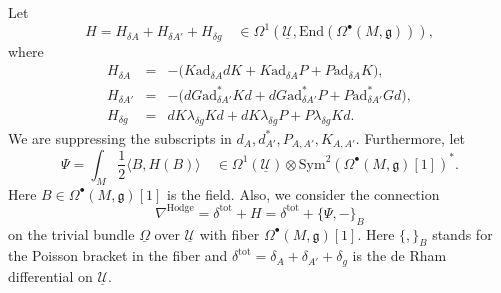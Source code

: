 \documentclass[11pt,a4paper]{amsart}
\theoremstyle{plain} %
\theoremstyle{definition}
\theoremstyle{remark}
\newcommand{\g}{\mathfrak{g}}
\newcommand{\mr}{\mathrm}
\newcommand{\bt}{\bullet}
\newcommand{\mc}{\mathcal}
\newcommand{\ad}{\mathrm{ad}}
\newcommand{\UU}{\underline{\mc{U}}}
\newcommand{\ul}{\underline}
\begin{document}
{Let
\begin{equation}\label{H}
H=H_{\delta A}+H_{\delta A'}+H_{\delta g}\quad \in \Omega^1(\UU,\mr{End}(\Omega^\bt(M,\g))),
\end{equation}
where
\begin{subequations}
\begin{eqnarray}
    H_{\delta A} &=&  -\Big(K\ad_{\delta A} dK+K\ad_{\delta A} P + P\ad_{\delta A} K\Big), 
    \label{H delta A}
    \\
    H_{\delta A'} &=& -\Big(dG\ad^*_{\delta A'}Kd + dG\ad^*_{\delta A'}P+P\ad^*_{\delta A'}Gd \Big), \label{H delta A'} \\
    H_{\delta g} &=& dK\lambda_{\delta g} Kd+  dK \lambda_{\delta g} P+ P\lambda_{\delta g} Kd. \label{H delta g}
\end{eqnarray}
\end{subequations}
We are suppressing the subscripts in $d_A, d^*_{A'}, P_{A,A'}, K_{A,A'}$. Furthermore, let
\begin{equation}
    \Psi=\int_M \frac12\langle B, H(B) \rangle\quad \in \Omega^1(\UU)\otimes \mr{Sym}^2(\Omega^\bt(M,\g)[1])^*.
\end{equation}
Here $B\in \Omega^\bt(M,\g)[1]$ is the field. Also, we consider the connection
\begin{equation}
    \nabla^\mr{Hodge}=
    \delta^\mr{tot}+ H = \delta^\mr{tot} + \{\Psi,-\}_B
\end{equation}
on the trivial bundle $\ul\Omega$ over $\UU$ with fiber $\Omega^\bt(M,\g)[1]$. Here $\{,\}_B$ stands for the Poisson bracket in the fiber and $\delta^\mr{tot}=\delta_A+\delta_{A'}+\delta_g$ is the de Rham differential on $\UU$.


}
\end{document}
